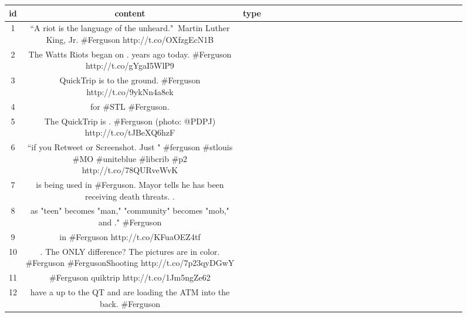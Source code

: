 \documentclass[a4paper,twoside,12pt,openright]{report}
\newcommand{\nl}{\tabularnewline\midrule}
\begin{document}
\newpage
\noindent
\begin{figure}[H]
\centering
\begin{tabular}{c|Cp{3cm}}
id & content & type \nl
1 & ``A riot is the language of the unheard." $~$Martin Luther King, Jr. \#Ferguson http://t.co/OXfzgEcN1B &  \newline {} \nl
2 & The Watts Riots began on .   years ago today. \#Ferguson http://t.co/gYgaI5WlP9 &  \newline {} \nl
3 & QuickTrip is  to the ground. \#Ferguson http://t.co/9ykNn4a8ek &  \newline {} \nl
4 &  for \#STL \#Ferguson. &  \newline {} \nl
5 & The QuickTrip is  . \#Ferguson (photo: @PDPJ) http://t.co/tJBeXQ6hzF &  \newline {} \nl
6 & ``if you Retweet or Screenshot. Just  " \#ferguson \#stlouis \#MO  \#uniteblue \#libcrib \#p2 http://t.co/78QURveWvK &  \newline {}  \nl
7 &  is being used in \#Ferguson.  Mayor tells  he has been receiving death threats. . &  \newline {} \nl
8 &  as "teen" becomes "man," "community" becomes "mob," and ." \#Ferguson  &  \newline {} \nl
9 &  in \#Ferguson http://t.co/KFuaOEZ4tf &  \newline {} \nl
10 & . The ONLY difference?  The pictures are in color.  \#Ferguson \#FergusonShooting http://t.co/7p23qyDGwY &  \newline {} \nl
11 & \#Ferguson quiktrip  http://t.co/1Jm5ngZe62 &  \newline {} \nl
12 &  have  a  up to the QT and are loading the ATM into the back. \#Ferguson &  \newline {} \nl

\end{tabular}
\end{figure}
\end{document}
